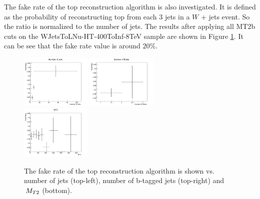 The fake rate of the top reconstruction algorithm is also investigated. It is defined as the probability of reconstructing top from each 3 jets in a $W$ + jets event. So the ratio is normalized to the number of jets. The results after applying all MT2b cuts on the WJetsToLNu-HT-400ToInf-8TeV sample are shown in Figure \ref{figtopref_fake}. It can be see that the fake rate value is around $20\%$.


\begin{figure}[htbp] 
\centering
    \includegraphics[width=0.3\textwidth]{figs/top_fake_NJets.png}
    \includegraphics[width=0.3\textwidth]{figs/top_fake_NBJets.png} \\
    \includegraphics[width=0.3\textwidth]{figs/top_fake_MT2.png}
    \caption{The fake rate of the top reconstruction algorithm is shown vs. number of jets (top-left), number
of b-tagged jets (top-right) and $\,{M_{T2}}$ (bottom).}
    \label{figtopref_fake}
\end{figure}
